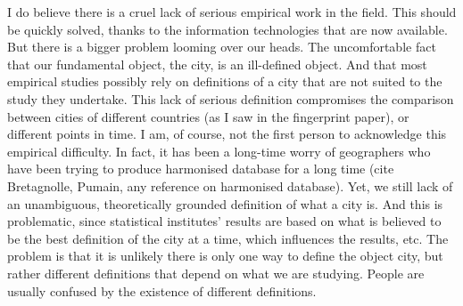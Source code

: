 I do believe there is a cruel lack of serious empirical work in the field. This
should be quickly solved, thanks to the information technologies that are now
available. But there is a bigger problem looming over our heads. The
uncomfortable fact that our fundamental object, the city, is an ill-defined
object. And that most empirical studies possibly rely on definitions of a city
that are not suited to the study they undertake. 
This lack of serious definition compromises the comparison between cities of
different countries (as I saw in the fingerprint paper), or different points in
time. I am, of course, not the first person to acknowledge this empirical
difficulty. In fact, it has been a long-time worry of geographers who have been
trying to produce harmonised database for a long time (cite
Bretagnolle, Pumain, any reference on harmonised database). Yet, we still lack
of an unambiguous, theoretically grounded definition of what a city is. And this
is problematic, since statistical institutes' results are based on what is
believed to be the best definition of the city at a time, which influences the
results, etc.
The problem is that it is unlikely there is only one way to define the object
city, but rather different definitions that depend on what we are studying.
People are usually confused by the existence of different definitions.


